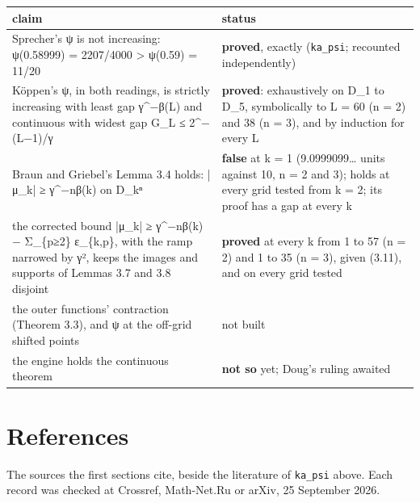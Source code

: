 {\small
\setlength{\tabcolsep}{6pt}
\begin{longtable}{>{\RaggedRight\arraybackslash}p{}>{\RaggedRight\arraybackslash}p{}}
\toprule
claim & status \\
\midrule
\endhead
Sprecher's ψ is not increasing: ψ(0.58999) = 2207/4000 > ψ(0.59) = 11/20 & \textbf{proved}, exactly (\texttt{ka\_\allowbreak{}psi}; recounted independently) \\
Köppen's ψ, in both readings, is strictly increasing with least gap γ\textasciicircum{}−β(L) and continuous with widest gap G\_\allowbreak{}L ≤ 2\textasciicircum{}−(L−1)/γ & \textbf{proved}: exhaustively on D\_\allowbreak{}1 to D\_\allowbreak{}5, symbolically to L = 60 (n = 2) and 38 (n = 3), and by induction for every L \\
Braun and Griebel's Lemma 3.4 holds: |μ\_\allowbreak{}k| ≥ γ\textasciicircum{}−nβ(k) on D\_\allowbreak{}kⁿ & \textbf{false} at k = 1 (9.0999099… units against 10, n = 2 and 3); holds at every grid tested from k = 2; its proof has a gap at every k \\
the corrected bound |μ\_\allowbreak{}k| ≥ γ\textasciicircum{}−nβ(k) − Σ\_\allowbreak{}\{p≥2\} ε\_\allowbreak{}\{k,p\}, with the ramp narrowed by γ², keeps the images and supports of Lemmas 3.7 and 3.8 disjoint & \textbf{proved} at every k from 1 to 57 (n = 2) and 1 to 35 (n = 3), given (3.11), and on every grid tested \\
the outer functions' contraction (Theorem 3.3), and ψ at the off-grid shifted points & not built \\
the engine holds the continuous theorem & \textbf{not so} yet; Doug's ruling awaited \\
\bottomrule
\end{longtable}
}

\section{\texorpdfstring{References}{References}}

The sources the first sections cite, beside the literature of \texttt{ka\_\allowbreak{}psi} above. Each record was checked at Crossref, Math-Net.Ru or arXiv, 25 September 2026.

